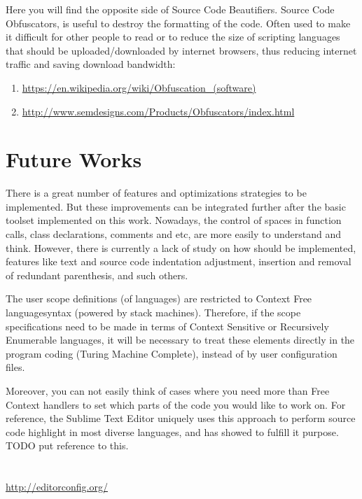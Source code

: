 Here you will find the opposite side of Source Code Beautifiers.
Source Code Obfuscators,
is useful to destroy the formatting of the code.
Often used to make it difficult for other people to read or to reduce the size of scripting languages that should be
uploaded/downloaded by internet browsers,
thus reducing internet traffic and saving download bandwidth:

\begin{sloppypar}
\begin{bluebox}\RaggedRight
\begin{enumerate}[leftmargin=*,parsep=0pt]

\item \url{https://en.wikipedia.org/wiki/Obfuscation_(software)}

\item \url{http://www.semdesigns.com/Products/Obfuscators/index.html}

\end{enumerate}
\end{bluebox}
\end{sloppypar}


\section{Future Works}

There is a great number of features and optimizations strategies to be implemented.
But these improvements can be integrated further after the basic toolset implemented on this work.
Nowadays,
the control of spaces in function calls,
class declarations, comments and etc,
are more easily to understand and think.
However,
there is currently a lack of study on how should be implemented,
features like text and source code indentation adjustment,
insertion and removal of redundant parenthesis, and such others.

The user scope definitions (of languages) are restricted to Context Free language\s syntax (powered by stack machines).
Therefore,
if the scope specifications need to be made in terms of Context Sensitive or Recursively Enumerable languages,
it will be necessary to treat these elements directly in the program coding (Turing Machine Complete),
instead of by user configuration files.

Moreover,
you can not easily think of cases where you need more than Free Context handlers to set which parts of the code you
would like to work on.
For reference,
the Sublime Text Editor uniquely uses this approach to perform source code highlight in most diverse languages,
and has showed to fulfill it purpose.
TODO put reference to this.


\section{}

\url{http://editorconfig.org/}
\cite{prettyPrintingOfVisualSentences}
\cite{anAbstractPrettyPrinter}
\cite{improvingRefactoringSpeed}
